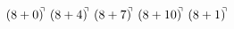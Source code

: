 \documentclass[preview]{standalone}
\begin{document}
\begin{align*}
(8+0)^{\hspace{-0.1cm}\urcorner} \ (8+4)^{\hspace{-0.1cm}\urcorner} \ (8+7)^{\hspace{-0.1cm}\urcorner} \ (8+10)^{\hspace{-0.1cm}\urcorner} \ (8+1)^{\hspace{-0.1cm}\urcorner}
\end{align*}
\end{document}
